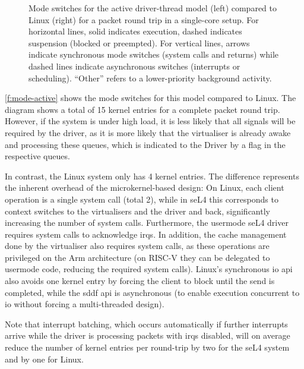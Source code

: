 \documentclass[a4paper,12pt]{report}
\newcommand{\code}[1]{\texttt{#1}}
\begin{document}
\begin{figure}[th]
  \hspace*{\fill}
  \caption[Mode switches for the active driver-thread model compared
  to Linux.]{Mode
    switches for the active driver-thread model (left) compared to
    Linux (right) for a packet round trip in a single-core setup. For horizontal lines,
    solid indicates execution, dashed indicates suspension (blocked or
    preempted). For vertical lines, arrows indicate synchronous mode
    switches (system calls and returns) while dashed lines indicate
    asynchronous switches (interrupts or scheduling). ``Other'' refers
    to a lower-priority background activity.}
  \label{f:mode-active}
\end{figure}


\autoref{f:mode-active} shows the mode switches for this model
compared to Linux.
The diagram shows a total of 15 kernel entries for a complete packet
round trip. However, if the system is under high load, it is less likely that
all signals will be required by the driver, as it is more likely that the virtualiser
is already awake and processing these queues, which is indicated to the Driver
by
a flag in the respective queues.

In contrast, the Linux system only has 4 kernel entries. The
difference represents the inherent overhead of the microkernel-based
design: On Linux, each client
operation is a single system call (total 2), while in seL4 this
corresponds to context switches to the virtualisers and the driver and
back, significantly increasing the number of system
calls. Furthermore, the usermode seL4 driver requires system calls to acknowledge
\glspl{irq}. In addition, the cache management done by the virtualiser also requires
system calls, as these operations are privileged on the Arm
architecture (on RISC-V they can be delegated to usermode code,
reducing the required system calls). Linux's synchronous \gls{io} \gls{api} also avoids one kernel entry
by forcing the client to block until the send is completed, while the
\gls{sddf} \gls{api} is asynchronous (to enable execution concurrent to \gls{io}
without forcing a multi-threaded design).

Note that interrupt batching, which occurs automatically if further
interrupts arrive while the driver is processing packets with \glspl{irq}
disabled, will on average reduce the number of kernel entries per
round-trip by two for the seL4 system and by one for Linux.
\end{document}

